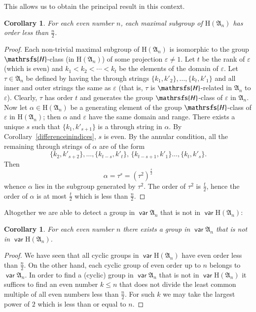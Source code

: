 \documentclass[preprint,1p,times]{elsarticle}
\DeclareMathOperator{\var}{\mathsf{var}}
\numberwithin{equation}{section}
\newtheorem{Cor}[Thm]{Corollary}
\theoremstyle{remark}
\def\Hc{\mathrsfs{H}}
\def\al{\alpha}
\def\ep{\varepsilon}
\def\H{\mathrm H}
\def\A{\mathfrak{A}}
\begin{document}
This allows us to obtain the principal result in this context.

\begin{Cor} \label{maximalsubgroups}
For each even number $n$, each maximal subgroup of $\H(\A_n)$ has order less than $\frac{n}{2}$.
\end{Cor}

\begin{proof}
Each non-trivial maximal subgroup of $\H(\A_n)$ is isomorphic to the group $\Hc$-class (in $\H(\A_n)$) of some
projection $\ep\ne 1$. Let $t$ be the rank of $\ep$ (which is even) and $k_1<k_2<\cdots<k_t$ be the elements of the
domain of $\ep$. Let $\tau\in \A_n$ be defined by having the through strings $\{k_1,k'_2\}, \dots,\{k_t,k'_1\}$ and all
inner and outer strings the same as $\ep$ (that is, $\tau$ is $\Hc$-related in $\A_n$ to $\ep$). Clearly, $\tau$ has
order $t$ and generates the group $\Hc$-class of $\ep$ in $\A_n$. Now let $\al\in \H(\A_n)$ be a generating element of
the group $\Hc$-class of $\ep$ in $\H(\A_n)$; then $\al$ and $\ep$ have the same domain and range. There exists a
unique $s$ such that $\{k_1,k'_{s+1}\}$ is a through string in $\al$. By Corollary~\ref{differenceinindices}, $s$ is
even. By the annular condition, all the remaining through strings of $\al$ are of the form
$$\{k_2,k'_{s+2}\},\dots,\{k_{t-s},k'_t\},\,\{k_{t-s+1},k'_1\}\dots,
\{k_t,k'_s\}.$$ Then
$$\al=\tau^s=(\tau^2)^{\frac s 2}$$ whence $\al$ lies in the
subgroup generated by $\tau^2$. The order of $\tau^2$ is $\frac t 2$, hence the order of $\al$ is at most $\frac t2$
which is less than $\frac n 2$.
\end{proof}

Altogether we are able to detect a group in $\var\A_n$ that is not in $\var\H(\A_n)$:

\begin{Cor}
\label{differenceofanandhan} For each even number $n$ there exists a group in $\var\A_n$ that is not in $\var\H(\A_n)$.
\end{Cor}

\begin{proof} We have seen that all cyclic groups in $\var\H(\A_n)$
have even order less than $\frac n2$. On the other hand, each cyclic group of even order up to $n$ belongs to
$\var\A_n$. In order to find a (cyclic) group in $\var\A_n$ that is not in $\var\H(\A_n)$ it suffices to find an even
number $k\le n$ that does not divide the least common multiple of all even numbers less than $\frac n 2$. For such $k$
we may take the largest power of $2$ which is less than or equal to $n$.
\end{proof}
\end{document}

